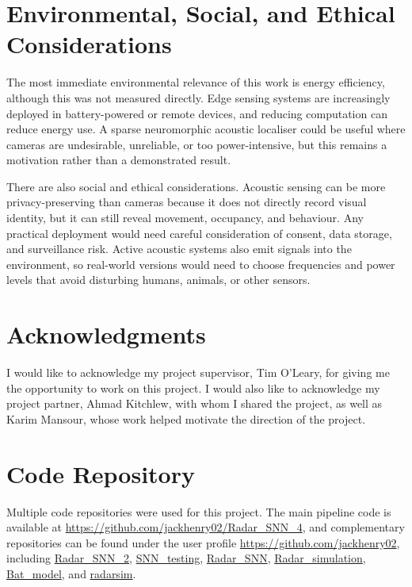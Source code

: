 \documentclass[12pt,a4paper]{report}
\begin{document}
\begin{appendices}
\section{Environmental, Social, and Ethical Considerations}

The most immediate environmental relevance of this work is energy efficiency, although this was not measured directly. Edge sensing systems are increasingly deployed in battery-powered or remote devices, and reducing computation can reduce energy use. A sparse neuromorphic acoustic localiser could be useful where cameras are undesirable, unreliable, or too power-intensive, but this remains a motivation rather than a demonstrated result.

There are also social and ethical considerations. Acoustic sensing can be more privacy-preserving than cameras because it does not directly record visual identity, but it can still reveal movement, occupancy, and behaviour. Any practical deployment would need careful consideration of consent, data storage, and surveillance risk. Active acoustic systems also emit signals into the environment, so real-world versions would need to choose frequencies and power levels that avoid disturbing humans, animals, or other sensors.

\section{Acknowledgments}

I would like to acknowledge my project supervisor, Tim O'Leary, for giving me the opportunity to work on this project. I would also like to acknowledge my project partner, Ahmad Kitchlew, with whom I shared the project, as well as Karim Mansour, whose work helped motivate the direction of the project.

\section{Code Repository}
Multiple code repositories were used for this project. The main pipeline code is available at \url{https://github.com/jackhenry02/Radar_SNN_4}, 
and complementary repositories can be found under the user profile 
\url{https://github.com/jackhenry02}, including \url{Radar_SNN_2}, 
\url{SNN_testing}, \url{Radar_SNN}, \url{Radar_simulation}, 
\url{Bat_model}, and \url{radarsim}.

\end{appendices}
\end{document}
